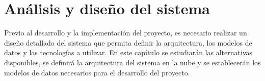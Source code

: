\chapter{Análisis y diseño del sistema}\label{chap:diseño}
Previo al desarrollo y la implementación del proyecto, es necesario realizar un
diseño detallado del sistema que permita definir la arquitectura, los modelos de
datos y las tecnologías a utilizar. En este capítulo se estudiarán las
alternativas disponibles, se definirá la arquitectura del sistema en la nube y
se establecerán los modelos de datos necesarios para el desarrollo del proyecto.




\newpage{}


\newpage{}

